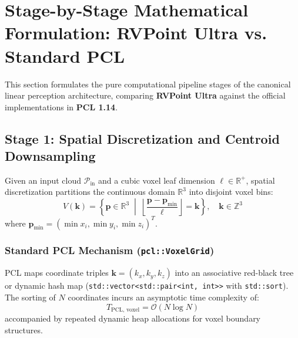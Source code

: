 \documentclass[journal,compsoc]{IEEEtran}
\begin{document}
\section{Stage-by-Stage Mathematical Formulation: RVPoint Ultra vs. Standard PCL}
\label{sec:ultra_formulation}

This section formulates the pure computational pipeline stages of the canonical linear perception architecture, comparing \textbf{RVPoint Ultra} against the official implementations in \textbf{PCL 1.14}.

\subsection{Stage 1: Spatial Discretization and Centroid Downsampling}
\label{sec:downsampling}

Given an input cloud $\mathcal{P}_{\text{in}}$ and a cubic voxel leaf dimension $\ell \in \mathbb{R}^+$, spatial discretization partitions the continuous domain $\mathbb{R}^3$ into disjoint voxel bins:
\begin{equation}
V(\bm{k}) = \left\{ \bm{p} \in \mathbb{R}^3 \;\middle|\; \left\lfloor \frac{\bm{p} - \bm{p}_{\min}}{\ell} \right\rfloor = \bm{k} \right\}, \quad \bm{k} \in \mathbb{Z}^3
\end{equation}
where $\bm{p}_{\min} = (\min x_i, \min y_i, \min z_i)^T$.

\subsubsection{Standard PCL Mechanism (\texttt{pcl::VoxelGrid})}
PCL maps coordinate triples $\bm{k} = (k_x, k_y, k_z)$ into an associative red-black tree or dynamic hash map (\texttt{std::vector<std::pair<int, int>>} with \texttt{std::sort}). The sorting of $N$ coordinates incurs an asymptotic time complexity of:
\begin{equation}
T_{\text{PCL, voxel}} = \mathcal{O}(N \log N)
\end{equation}
accompanied by repeated dynamic heap allocations for voxel boundary structures.
\end{document}
